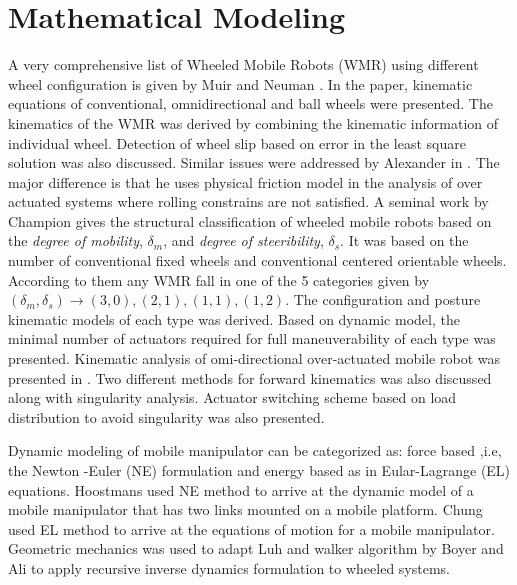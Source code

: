 \section{Mathematical Modeling}
A very comprehensive list of Wheeled Mobile Robots (WMR) using different wheel configuration is given by Muir and Neuman \cite{muir1987kinematic}. In the paper, kinematic equations of conventional, omnidirectional and ball wheels were presented. The kinematics of the WMR was derived by combining the kinematic information of   individual wheel. Detection of wheel slip based on  error in the least square solution was also discussed. Similar issues were addressed by Alexander in \cite{alexander1989kinematics}. The major difference is that he uses physical friction model in the analysis of over actuated systems where rolling constrains are not satisfied. A seminal work by Champion \cite{campion1996structural} gives the structural classification of wheeled mobile robots based on the \textit{degree of mobility}, $\delta_m$, and \textit{degree of steeribility}, $\delta_s$. It was based on the number of conventional fixed wheels and  conventional centered orientable wheels. According to them any WMR fall in one of the 5 categories given by $(\delta_m,\delta_s)\rightarrow(3,0),(2,1),(1,1),(1,2)$. 
The configuration and posture kinematic models of each type was derived. Based on  dynamic model, the minimal number of actuators required for full maneuverability of each type was presented. Kinematic analysis of omi-directional over-actuated mobile robot  was presented in \cite{yi2002kinematics}. Two different methods for forward kinematics was also discussed along with  singularity analysis. Actuator switching scheme based on load distribution to avoid singularity was also presented. 

Dynamic modeling of mobile manipulator can be categorized as: force based ,i.e, the Newton -Euler (NE) formulation and  energy based as in Eular-Lagrange (EL) equations. Hoostmans \cite{hootsmans1992motion} used NE method to arrive at  the dynamic model of a mobile manipulator that has two links mounted on a mobile platform. Chung \cite{chung1998interaction} used EL method to arrive at the equations of motion for a mobile manipulator. Geometric mechanics was used to adapt Luh and walker \cite{luh1980line} algorithm  by Boyer and Ali \cite{boyer2011recursive} to apply recursive inverse dynamics formulation to wheeled systems.   

